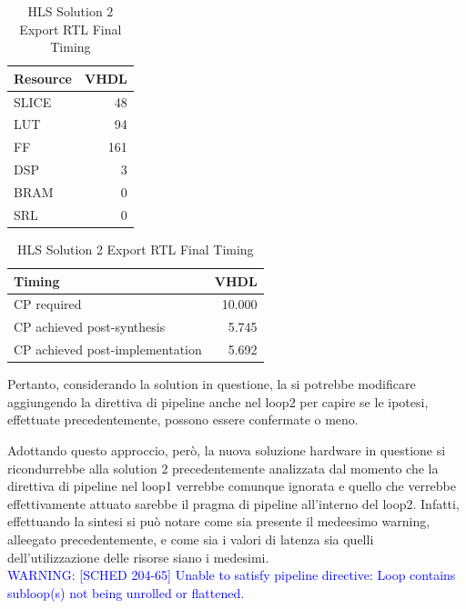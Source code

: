\begin{table}[H]
	\centering
	\begin{minipage}[t]{0.45\linewidth}
		\centering
		\begin{tabular}{|l|r|}
			\hline
			\textbf{Resource} & \textbf{VHDL} \\
			\hline
			SLICE & 48 \\
			\hline
			LUT & 94 \\
			\hline
			FF & 161 \\
			\hline
			DSP & 3 \\
			\hline
			BRAM & 0 \\
			\hline
			SRL & 0 \\
			\hline
		\end{tabular}
		\caption{HLS Solution 2t Export RTL Resource Usage}
		\label{tab:hls-solution-2-export-rtl-resoruce-usage}
	\end{minipage}
	\hfill
	\begin{minipage}[t]{0.45\linewidth}
		\centering
		\begin{tabular}{|l|r|}
			\hline
			\textbf{Timing} & \textbf{VHDL} \\
			\hline
			CP required & 10.000 \\
			\hline
			CP achieved post-synthesis & 5.745 \\
			\hline
			CP achieved post-implementation & 5.692 \\
			\hline
		\end{tabular}
		\caption{HLS Solution 2 Export RTL Final Timing}
		\label{tab:hls-solution-2-export-rtl-final-timing}
	\end{minipage}
\end{table}


Pertanto, considerando la solution in questione, la si potrebbe modificare aggiungendo la direttiva di pipeline anche nel loop2 per capire se le ipotesi, effettuate precedentemente, possono essere confermate o meno. 



Adottando questo approccio, però, la nuova soluzione hardware in questione si ricondurrebbe alla solution 2 precedentemente analizzata dal momento che la direttiva di pipeline nel loop1 verrebbe comunque ignorata e quello che verrebbe effettivamente attuato sarebbe il pragma di pipeline all'interno del loop2. Infatti, effettuando la sintesi si può notare come sia presente il medeesimo warning, alleegato precedentemente, e come sia i valori di latenza sia quelli dell'utilizzazione delle risorse siano i medesimi.
\\
\textcolor{blue}{WARNING: [SCHED 204-65] Unable to satisfy pipeline directive: Loop contains subloop(s) not being unrolled or flattened.}

